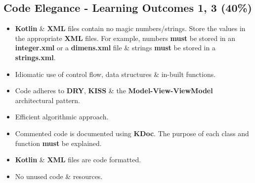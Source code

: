 \documentclass{article}
\begin{document}
\subsection*{Code Elegance - Learning Outcomes 1, 3 (40\%)}
\begin{itemize}
	\item \textbf{Kotlin} \& \textbf{XML} files contain no magic numbers/strings. Store the values in the appropriate \textbf{XML} files. For example, numbers \textbf{must} be stored in an \textbf{integer.xml} or a \textbf{dimens.xml} file \& strings \textbf{must} be stored in a \textbf{strings.xml}.
	\item Idiomatic use of control flow, data structures \& in-built functions.
	\item Code adheres to \textbf{DRY}, \textbf{KISS} \& the \textbf{Model-View-ViewModel} architectural pattern.
	\item Efficient algorithmic approach.
	\item Commented code is documented using \textbf{KDoc}. The purpose of each class and function \textbf{must} be explained.
	\item \textbf{Kotlin} \& \textbf{XML} files are code formatted.
	\item No unused code \& resources.
\end{itemize}
\end{document}
